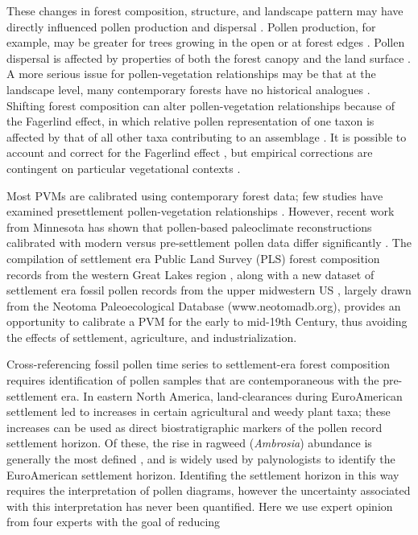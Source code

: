 \documentclass[12pt]{article}
\begin{document}
These changes in forest composition, structure, and landscape pattern
may have directly influenced pollen production and dispersal
\citep{kujawa2015}.  Pollen production, for example, may be greater
for trees growing in the open or at forest edges \citep{XXX}.  Pollen
dispersal is affected by properties of both the forest canopy and the
land surface \citep{jackson1999pollen}.  A more serious issue for
pollen-vegetation relationships may be that at the landscape level,
many contemporary forests have no historical analogues
\citep{goring_witness}. Shifting forest composition can alter
pollen-vegetation relationships because of the Fagerlind effect, in
which relative pollen representation of one taxon is affected by that
of all other taxa contributing to an assemblage
\citep{prentice1988records}. It is possible to account and correct for
the Fagerlind effect \citep{prentice1986, jackson1995exploration}, but
empirical corrections are contingent on particular vegetational
contexts \citep{jackson1998quantitative}.

Most PVMs are calibrated using contemporary forest data; few studies
have examined presettlement pollen-vegetation relationships
\citep{schwartz1989predicting}.  However, recent work from Minnesota
has shown that pollen-based paleoclimate reconstructions calibrated
with modern versus pre-settlement pollen data differ significantly
\citep{st2014bias}. The compilation of settlement era Public Land
Survey (PLS) forest composition records from the western Great Lakes
region \citep{goring_witness, bourdo1956review, schulte2001original,
  almendinger1996minnesota}, along with a new dataset of settlement
era fossil pollen records from the upper midwestern US
\citep{kujawa2015}, largely drawn from the Neotoma Paleoecological
Database (www.neotomadb.org), provides an opportunity to calibrate a
PVM for the early to mid-19th Century, thus avoiding the effects of
settlement, agriculture, and industrialization.

Cross-referencing fossil pollen time series to settlement-era forest
composition requires identification of pollen samples that are
contemporaneous with the pre-settlement era.  In eastern North
America, land-clearances during EuroAmerican settlement led to
increases in certain agricultural and weedy plant taxa; these
increases can be used as direct biostratigraphic markers of the pollen
record settlement horizon.  Of these, the rise in ragweed
(\textit{Ambrosia}) abundance is generally the most defined
\citep{mcandrews1988human}, and is widely used by palynologists to
identify the EuroAmerican settlement horizon. Identifing the
settlement horizon in this way requires the interpretation of pollen
diagrams, however the uncertainty associated with this interpretation
has never been quantified. Here we use expert opinion from four experts with the goal of reducing
\end{document}

